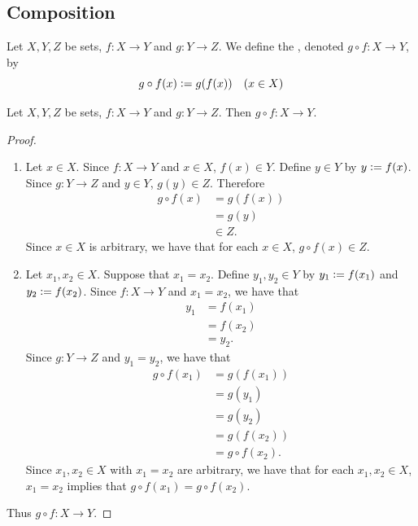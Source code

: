 \documentclass{book}
\begin{document}
	
	
	
	
	
	
	
	
	
	
	
	
	
	
	
	
	
	
	
	
	\subsection{Composition}
	
	\begin{defn}
		Let $X,Y,Z$ be sets, $f:X \rightarrow Y$ and $g:Y \rightarrow Z$. We define the , denoted $g \circ f: X \rightarrow Y$, by 
		$$g \circ f(x) \vcentcolon= g(f(x)) \quad (x \in X)$$
	\end{defn}
	
	\begin{ex}
		Let $X,Y,Z$ be sets, $f:X \rightarrow Y$ and $g:Y \rightarrow Z$. Then $g \circ f: X \rightarrow Y$.
	\end{ex}
	
	\begin{proof}\
		\begin{enumerate}
			\item Let $x \in X$. Since $f:X \rightarrow Y$ and $x \in X$, $f(x) \in Y$. Define $y \in Y$ by $y \vcentcolon= f(x)$. Since $g:Y \rightarrow Z$ and $y \in Y$, $g(y) \in Z$. Therefore 
			\begin{align*}
				g \circ f(x)
				& = g(f(x)) \\
				& = g(y) \\
				& \in Z.
			\end{align*}
			Since $x \in X$ is arbitrary, we have that for each $x \in X$, $g \circ f(x) \in Z$. 
			\item Let $x_1, x_2 \in X$. Suppose that $x_1 = x_2$. Define $y_1, y_2 \in Y$ by $y_1 \vcentcolon= f(x_1)$ and $y_2 \vcentcolon= f(x_2)$. Since $f:X \rightarrow Y$ and $x_1 = x_2$, we have that 
			\begin{align*}
				y_1
				& = f(x_1) \\
				& = f(x_2) \\
				& = y_2.
			\end{align*} 
			Since $g:Y \rightarrow Z$ and $y_1 = y_2$, we have that 
			\begin{align*}
				g \circ f(x_1)
				& = g(f(x_1)) \\
				& = g(y_1) \\
				& = g(y_2) \\
				& = g(f(x_2)) \\
				& = g \circ f(x_2).
			\end{align*}
			Since $x_1, x_2 \in X$ with $x_1 = x_2$ are arbitrary, we have that for each $x_1, x_2 \in X$, $x_1 = x_2$ implies that $g \circ f(x_1) = g \circ f(x_2)$.
		\end{enumerate}
		Thus $g \circ f:X \rightarrow Y$. 
	\end{proof}
	
\end{document}
